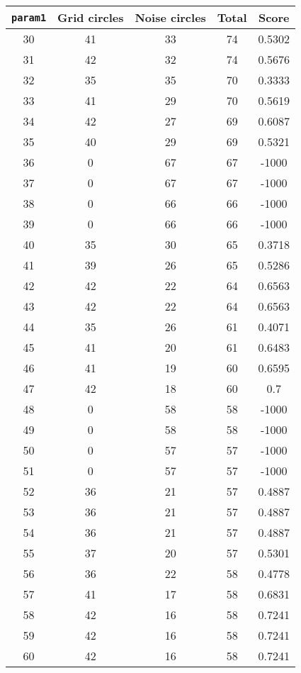 \documentclass[letterpaper, 12pt]{article}
\begin{document}
\begin{longtable}{|c|c|c|c|c|}
\hline
\textbf{\texttt{param1}} & \textbf{Grid circles} & \textbf{Noise circles} & \textbf{Total} & \textbf{Score} \\
\hline
30 & 41 & 33 & 74 & 0.5302 \\
\hline
31 & 42 & 32 & 74 & 0.5676 \\
\hline
32 & 35 & 35 & 70 & 0.3333 \\
\hline
33 & 41 & 29 & 70 & 0.5619 \\
\hline
34 & 42 & 27 & 69 & 0.6087 \\
\hline
35 & 40 & 29 & 69 & 0.5321 \\
\hline
36 & 0 & 67 & 67 & -1000 \\
\hline
37 & 0 & 67 & 67 & -1000 \\
\hline
38 & 0 & 66 & 66 & -1000 \\
\hline
39 & 0 & 66 & 66 & -1000 \\
\hline
40 & 35 & 30 & 65 & 0.3718 \\
\hline
41 & 39 & 26 & 65 & 0.5286 \\
\hline
42 & 42 & 22 & 64 & 0.6563 \\
\hline
43 & 42 & 22 & 64 & 0.6563 \\
\hline
44 & 35 & 26 & 61 & 0.4071 \\
\hline
45 & 41 & 20 & 61 & 0.6483 \\
\hline
46 & 41 & 19 & 60 & 0.6595 \\
\hline
47 & 42 & 18 & 60 & 0.7 \\
\hline
48 & 0 & 58 & 58 & -1000 \\
\hline
49 & 0 & 58 & 58 & -1000 \\
\hline
50 & 0 & 57 & 57 & -1000 \\
\hline
51 & 0 & 57 & 57 & -1000 \\
\hline
52 & 36 & 21 & 57 & 0.4887 \\
\hline
53 & 36 & 21 & 57 & 0.4887 \\
\hline
54 & 36 & 21 & 57 & 0.4887 \\
\hline
55 & 37 & 20 & 57 & 0.5301 \\
\hline
56 & 36 & 22 & 58 & 0.4778 \\
\hline
57 & 41 & 17 & 58 & 0.6831 \\
\hline
58 & 42 & 16 & 58 & 0.7241 \\
\hline
59 & 42 & 16 & 58 & 0.7241 \\
\hline
60 & 42 & 16 & 58 & 0.7241 \\
\hline

\end{longtable}
\end{document}
